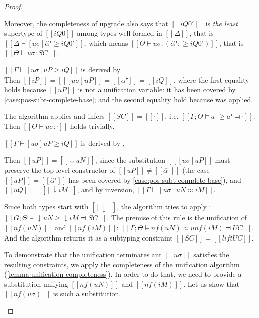 \begin{proof}
\begin{caseof}
            Moreover, the completeness of upgrade also says that $[[iQ0']]$ is 
            \emph{the least} supertype of $[[iQ0]]$ among types well-formed in $[[Δ]]$, 
            that is $[[Δ ⊢ [uσ]α̂⁺ ≥ iQ0']]$, which means 
            $[[ Θ   ⊢ uσ : (α̂⁺ :≥ iQ0') ]]$, that is $[[ Θ   ⊢ uσ : SC ]]$.

        \item \label{case:pos-subt-complete-pvar}
            $[[ Γ ⊢ [uσ]uP ≥ iQ ]]$ is derived by \\
            Then $[[iP]] = [[ [uσ]uP ]] = [[ α⁺ ]] = [[iQ]]$, where
            the first equality holds because $[[uP]]$ is not a unification variable:
            it has been covered by \cref{case:pos-subt-complete-base}; and
            the second equality hold because  was applied.

            The algorithm applies  and 
            infers $[[SC]] = [[·]]$, i.e. $[[Γ;Θ ⊨ a⁺ ≥ a⁺ ⫤ ·]]$.
            Then $[[ Θ   ⊢ uσ : · ]]$ holds trivially.


        \item \label{case:pos-subt-complete-upshift} 
            $[[ Γ ⊢ [uσ]uP ≥ iQ ]]$ 
            is derived by ,
            
            Then $[[ uP ]] = [[ ↓uN ]]$, since the substitution $[[ [uσ]uP ]]$ must preserve the 
            top-level constructor of $[[uP]]\neq [[α̂⁺]]$ (the case $[[uP]] = [[α̂⁺]]$ has been covered
            by \cref{case:pos-subt-complete-base}), and $[[uQ]] = [[ ↓iM ]]$,
            and by inversion, $[[ Γ ⊢ [uσ]uN ≈ iM ]]$.

            Since both types start with $[[↓]]$, 
            the algorithm tries to apply : 
            $[[G;Θ ⊨ ↓uN ≥ ↓iM ⫤ SC]]$. The premise of this rule is the
            unification of $[[nf(uN)]]$ and $[[nf(iM)]]$:
            $[[Γ;Θ ⊨ nf(uN) ≈u nf(iM) ⫤ UC]]$. And the algorithm 
            returns it as a subtyping constraint $[[SC]] = [[lift UC]]$.


            To demonstrate that the unification terminates
            ant $[[uσ]]$ satisfies the resulting constraints, 
            we apply the completeness 
            of the unification algorithm (\cref{lemma:unification-completeness}). 
            In order to do that, we need to provide a substitution unifying  
            $[[nf(uN)]]$ and $[[nf(iM)]]$. 
            Let us show that $[[nf(uσ)]]$ is such a substitution. 


\end{caseof}
\end{proof}
